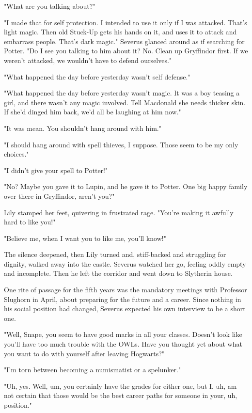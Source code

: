 \documentclass[a4paper,11pt]{article}
\begin{document}
"What are you talking about?"

"I made that for self protection. I intended to use it only if I was attacked. That's light magic. Then old Stuck-Up gets his hands on it, and uses it to attack and embarrass people. That's dark magic." Severus glanced around as if searching for Potter. "Do I see you talking to him about it? No. Clean up Gryffindor first. If we weren't attacked, we wouldn't have to defend ourselves."

"What happened the day before yesterday wasn't self defense."

"What happened the day before yesterday wasn't magic. It was a boy teasing a girl, and there wasn't any magic involved. Tell Macdonald she needs thicker skin. If she'd dinged him back, we'd all be laughing at him now."

"It was mean. You shouldn't hang around with him."

"I should hang around with spell thieves, I suppose. Those seem to be my only choices."

"I didn't give your spell to Potter!"

"No? Maybe you gave it to Lupin, and he gave it to Potter. One big happy family over there in Gryffindor, aren't you?"

Lily stamped her feet, quivering in frustrated rage. "You're making it awfully hard to like you!"

"Believe me, when I want you to like me, you'll know!"

The silence deepened, then Lily turned and, stiff-backed and struggling for dignity, walked away into the castle. Severus watched her go, feeling oddly empty and incomplete. Then he left the corridor and went down to Slytherin house.

One rite of passage for the fifth years was the mandatory meetings with Professor Slughorn in April, about preparing for the future and a career. Since nothing in his social position had changed, Severus expected his own interview to be a short one.

"Well, Snape, you seem to have good marks in all your classes. Doesn't look like you'll have too much trouble with the OWLs. Have you thought yet about what you want to do with yourself after leaving Hogwarts?"

"I'm torn between becoming a numismatist or a spelunker."

"Uh, yes. Well, um, you certainly have the grades for either one, but I, uh, am not certain that those would be the best career paths for someone in your, uh, position."
\end{document}
